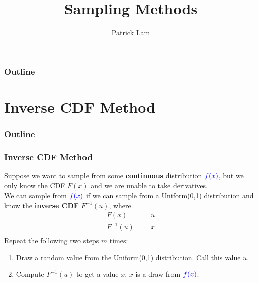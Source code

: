 \documentclass{beamer}
\author{Patrick Lam}
\title{Sampling Methods}
\date{}
\begin{document}
\newcommand{\red}{\textcolor{red}}
\newcommand{\blue}{\textcolor{blue}}
\newcommand{\purple}{\textcolor{purple}}

\frame{\titlepage}

\begin{frame}
\frametitle{Outline}
\tableofcontents
\end{frame}


\section{Inverse CDF Method}

\begin{frame}
\frametitle{Outline}
\tableofcontents[currentsection]
\end{frame}

\begin{frame}
\frametitle{Inverse CDF Method}
\pause
Suppose we want to sample from some \textbf{continuous} distribution
$\blue{f(x)}$, but we only know the CDF $F(x)$ and we are unable to
take derivatives.  \\
\pause
\bigskip
We can sample from $\blue{f(x)}$ if we can sample from a Uniform(0,1)
distribution and know the \textbf{inverse CDF} $F^{-1}(u)$, \pause where
\begin{eqnarray*}
F(x) &=& u\\
F^{-1}(u) &=& x\\
\end{eqnarray*}
\pause
Repeat the following two steps $m$ times:
\pause
\begin{enumerate}
\item Draw a random value from the Uniform(0,1)
distribution. Call this value $u$.
\pause
\item Compute $F^{-1}(u)$ to get a value $x$.  $x$ is a
draw from $\blue{f(x)}$.
\end{enumerate}
\end{frame}
\end{document}
